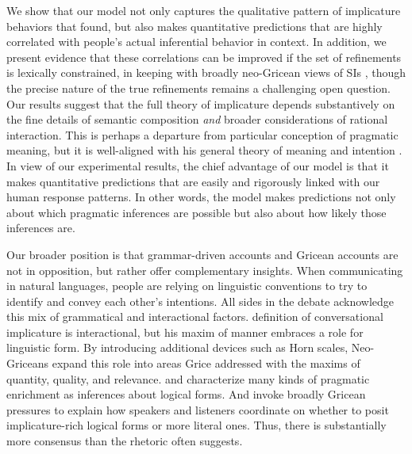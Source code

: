 \documentclass[leqno,12pt]{article}
\begin{document}

We show that our model not only captures the qualitative pattern of
implicature behaviors that \citeauthor{Chemla:Spector:2011} found, but
also makes quantitative predictions that are highly correlated with
people's actual inferential behavior in context. In addition, we
present evidence that these correlations can be improved if the set of
refinements is lexically constrained, in keeping with broadly
neo-Gricean views of SIs
\citep{Horn72,Gazdar79b,Gazdar79a,SchulzVanRooij06}, though the
precise nature of the true refinements remains a challenging open
question.  Our results suggest that the full theory of implicature
depends substantively on the fine details of semantic composition
\emph{and} broader considerations of rational interaction. This is
perhaps a departure from  particular conception of
pragmatic meaning, but it is well-aligned with his general theory of
meaning and intention \citep{Grice89}.  In view of our experimental
results, the chief advantage of our model is that it makes
quantitative predictions that are easily and rigorously linked with
our human response patterns. In other words, the model makes
predictions not only about which pragmatic inferences are possible but
also about how likely those inferences are.

Our broader position is that grammar-driven accounts and Gricean
accounts are not in opposition, but rather offer complementary
insights.  When communicating in natural languages, people are relying
on linguistic conventions to try to identify and convey each other's
intentions. All sides in the debate acknowledge this mix of
grammatical and interactional factors.  definition
of conversational implicature is interactional, but his maxim of
manner embraces a role for linguistic form. By introducing additional devices
such as Horn scales, Neo-Griceans expand this role into areas Grice
addressed with the maxims of quantity, quality, and
relevance. \citet{Sperber95} and \citet{Bach94} characterize many
kinds of pragmatic enrichment as inferences about logical forms. And
\citet{ChierchiaFoxSpector08} invoke broadly Gricean pressures to
explain how speakers and listeners coordinate on whether to posit
implicature-rich logical forms or more literal ones. Thus, there is
substantially more consensus than the rhetoric often suggests.

\end{document}
